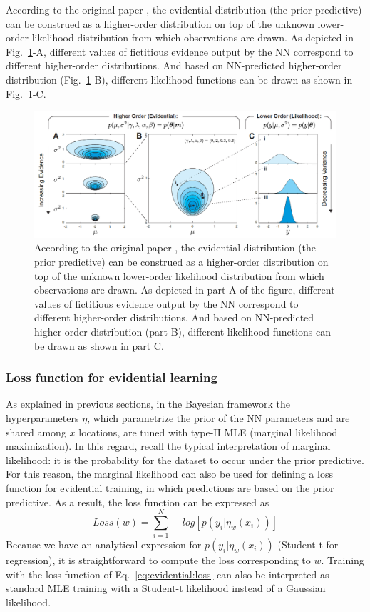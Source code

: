 According to the original paper \textcite{amini2020deep}, the evidential distribution (the prior predictive) can be construed as a higher-order distribution on top of the unknown lower-order likelihood distribution from which observations are drawn. 
As depicted in Fig.~\ref{fig:evidential:distribution}-A, different values of fictitious evidence output by the NN correspond to different higher-order distributions. 
And based on NN-predicted higher-order distribution (Fig.~\ref{fig:evidential:distribution}-B), different likelihood functions can be drawn as shown in Fig.~\ref{fig:evidential:distribution}-C.
\begin{figure}[H]
	\centering
	\includegraphics[width=.85\linewidth]{./figs/evidential_distributions.png}
	\caption{According to the original paper \textcite{amini2020deep}, the evidential distribution (the prior predictive) can be construed as a higher-order distribution on top of the unknown lower-order likelihood distribution from which observations are drawn. 
		As depicted in part A of the figure, different values of fictitious evidence output by the NN correspond to different higher-order distributions. 
		And based on NN-predicted higher-order distribution (part B), different likelihood functions can be drawn as shown in part C.}
	\label{fig:evidential:distribution}
\end{figure}

\subsubsection{Loss function for evidential learning}
As explained in previous sections, in the Bayesian framework the hyperparameters $\eta$, which parametrize the prior of the NN parameters and are shared among $x$ locations, are tuned with type-II MLE (marginal likelihood maximization). 
In this regard, recall the typical interpretation of marginal likelihood: it is the probability for the dataset to occur under the prior predictive. 
For this reason, the marginal likelihood can also be used for defining a loss function for evidential training, in which predictions are based on the prior predictive.
As a result, the loss function can be expressed as
\begin{equation}\label{eq:evidential:loss}
	Loss(w) = \sum_{i=1}^{N} -log [p(y_i|\eta_w(x_i))]
\end{equation}
Because we have an analytical expression for $p(y_i|\eta_w(x_i))$ (Student-t for regression), it is straightforward to compute the loss corresponding to $w$.
Training with the loss function of Eq.~\eqref{eq:evidential:loss} can also be interpreted as standard MLE training with a Student-t likelihood instead of a Gaussian likelihood. 

